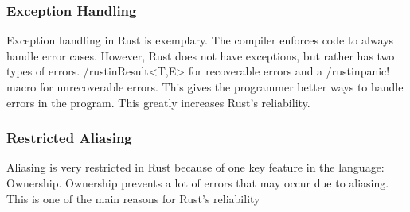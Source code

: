 \documentclass{article}
\begin{document}
  \subsubsection{Exception Handling}
  Exception handling in Rust is exemplary. The compiler enforces code to always
  handle error cases. However, Rust does not have exceptions, but rather has two
  types of errors. /rustin{Result<T,E>} for recoverable errors and a
  /rustin{panic!} macro for unrecoverable errors. This gives the programmer
  better ways to handle errors in the program. This greatly increases Rust's
  reliability.

  \subsubsection{Restricted Aliasing}
  Aliasing is very restricted in Rust because of one key feature in the
  language: Ownership. Ownership prevents a lot of errors that may occur due to
  aliasing. This is one of the main reasons for Rust's reliability

  \newpage
  \nocite{*} \printbibliography[heading=bibintoc,title={References}]{}
\end{document}
